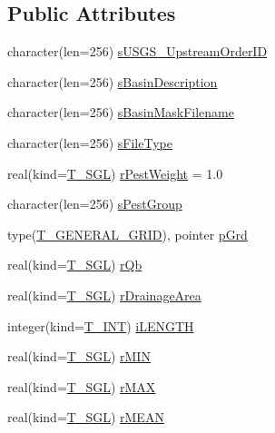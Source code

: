 \subsection*{Public Attributes}
\begin{DoxyCompactItemize}
\item 
character(len=256) \hyperlink{typetypes_1_1_t___b_a_s_i_n___m_a_s_k_a78f33392b7c282786247688a9060f0d8}{sUSGS\_\-UpstreamOrderID}
\item 
character(len=256) \hyperlink{typetypes_1_1_t___b_a_s_i_n___m_a_s_k_a7d23e472e9bdf341e272b8c4e0135a70}{sBasinDescription}
\item 
character(len=256) \hyperlink{typetypes_1_1_t___b_a_s_i_n___m_a_s_k_a68b9d791a32a3ce32d2dad4dd8973b72}{sBasinMaskFilename}
\item 
character(len=256) \hyperlink{typetypes_1_1_t___b_a_s_i_n___m_a_s_k_ae0103cba824946fdc8f8c2c5965351a5}{sFileType}
\item 
real(kind=\hyperlink{namespacetypes_af3012489af4c138f271f1bce244b7e51}{T\_\-SGL}) \hyperlink{typetypes_1_1_t___b_a_s_i_n___m_a_s_k_a2dc814f4cd552f347e163e6fc9844f6c}{rPestWeight} = 1.0
\item 
character(len=256) \hyperlink{typetypes_1_1_t___b_a_s_i_n___m_a_s_k_ae49a2da9fb28e16c75c6097631ef550d}{sPestGroup}
\item 
type(\hyperlink{typetypes_1_1_t___g_e_n_e_r_a_l___g_r_i_d}{T\_\-GENERAL\_\-GRID}), pointer \hyperlink{typetypes_1_1_t___b_a_s_i_n___m_a_s_k_a449a8c3d41d08d96d47e73b53eeacbdf}{pGrd}
\item 
real(kind=\hyperlink{namespacetypes_af3012489af4c138f271f1bce244b7e51}{T\_\-SGL}) \hyperlink{typetypes_1_1_t___b_a_s_i_n___m_a_s_k_a77d01ae3382fc6a95ac1dbae506f1b5e}{rQb}
\item 
real(kind=\hyperlink{namespacetypes_af3012489af4c138f271f1bce244b7e51}{T\_\-SGL}) \hyperlink{typetypes_1_1_t___b_a_s_i_n___m_a_s_k_ad1549992d679cfda8e698c291d8cad5b}{rDrainageArea}
\item 
integer(kind=\hyperlink{namespacetypes_a4e4d040a4425196c4d43be63e7e6103a}{T\_\-INT}) \hyperlink{typetypes_1_1_t___b_a_s_i_n___m_a_s_k_a2c5a49fa08b7d530c404c93f4c79460e}{iLENGTH}
\item 
real(kind=\hyperlink{namespacetypes_af3012489af4c138f271f1bce244b7e51}{T\_\-SGL}) \hyperlink{typetypes_1_1_t___b_a_s_i_n___m_a_s_k_a77f0f564fb85e20fb286772f1894c2d3}{rMIN}
\item 
real(kind=\hyperlink{namespacetypes_af3012489af4c138f271f1bce244b7e51}{T\_\-SGL}) \hyperlink{typetypes_1_1_t___b_a_s_i_n___m_a_s_k_adec4aa4e75d409d183341d4b1657e6bc}{rMAX}
\item 
real(kind=\hyperlink{namespacetypes_af3012489af4c138f271f1bce244b7e51}{T\_\-SGL}) \hyperlink{typetypes_1_1_t___b_a_s_i_n___m_a_s_k_a0c53ee195cfab0c097f2a46bd7d56439}{rMEAN}
\end{DoxyCompactItemize}


